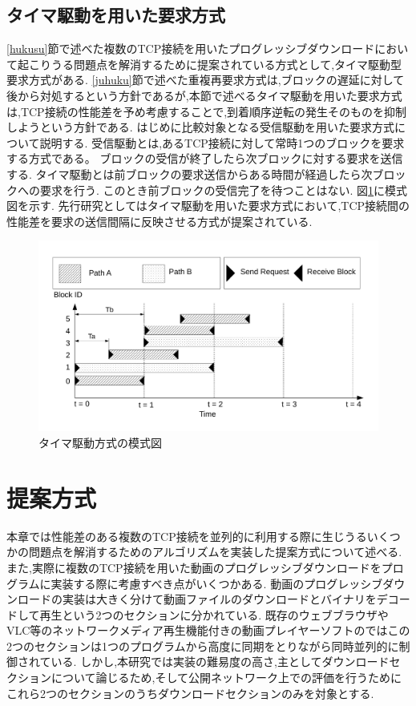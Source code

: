\documentclass[a4j,12pt]{gradthesis_utf8}
\begin{document}
 
 \section{タイマ駆動を用いた要求方式}
 \ref{hukusu}節で述べた複数のTCP接続を用いたプログレッシブダウンロードにおいて起こりうる問題点を解消するために提案されている方式として,タイマ駆動型要求方式がある.
 \ref{juhuku}節で述べた重複再要求方式は,ブロックの遅延に対して後から対処するという方針であるが,本節で述べるタイマ駆動を用いた要求方式は,TCP接続の性能差を予め考慮することで,到着順序逆転の発生そのものを抑制しようという方針である.
 はじめに比較対象となる受信駆動を用いた要求方式について説明する.
 受信駆動とは,あるTCP接続に対して常時1つのブロックを要求する方式である。
 ブロックの受信が終了したら次ブロックに対する要求を送信する.
 タイマ駆動とは前ブロックの要求送信からある時間が経過したら次ブロックへの要求を行う.
 このとき前ブロックの受信完了を待つことはない.
 図\ref{timer}に模式図を示す.
 先行研究としてはタイマ駆動を用いた要求方式において,TCP接続間の性能差を要求の送信間隔に反映させる方式が提案されている.
 
 \begin{figure}[ht]
 	\centering
 	\includegraphics[width=16.5cm]{figure/timer.pdf}
 	\caption{タイマ駆動方式の模式図}
	\label{timer}
 \end{figure}
 
\chapter{提案方式}\label{sec:sec3}
本章では性能差のある複数のTCP接続を並列的に利用する際に生じうるいくつかの問題点を解消するためのアルゴリズムを実装した提案方式について述べる.
また,実際に複数のTCP接続を用いた動画のプログレッシブダウンロードをプログラムに実装する際に考慮すべき点がいくつかある.
動画のプログレッシブダウンロードの実装は大きく分けて動画ファイルのダウンロードとバイナリをデコードして再生という2つのセクションに分かれている.
既存のウェブブラウザやVLC\cite{vlc}等のネットワークメディア再生機能付きの動画プレイヤーソフトのではこの2つのセクションは1つのプログラムから高度に同期をとりながら同時並列的に制御されている.
しかし,本研究では実装の難易度の高さ,主としてダウンロードセクションについて論じるため,そして公開ネットワーク上での評価を行うためにこれら2つのセクションのうちダウンロードセクションのみを対象とする.
\end{document}
